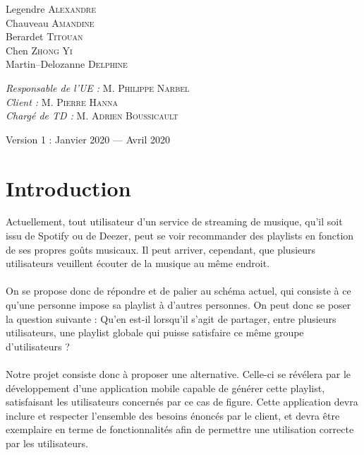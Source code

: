 \documentclass[12pt, openany]{report}
\begin{document}
\begin{titlepage}
\begin{sffamily}
\begin{center}
    \begin{minipage}{0.4\textwidth}
      \begin{flushleft} \large
        Legendre \textsc{Alexandre}\\
        Chauveau \textsc{Amandine}\\
        Berardet \textsc{Titouan}\\
        Chen \textsc{Zhong Yi}\\
        Martin--Delozanne \textsc{Delphine}\\
      \end{flushleft}
    \end{minipage}
    \begin{minipage}{0.4\textwidth}
      \begin{flushright} \large
        \emph{Responsable de l'UE : } M. \textsc{Philippe Narbel}\\
        \emph{Client : } M. \textsc{Pierre Hanna}\\
        \emph{Chargé de TD : } M. \textsc{Adrien Boussicault}
      \end{flushright}
    \end{minipage}

    \vfill

    {\large Version 1 : Janvier 2020 — Avril 2020}

  \end{center}
  \end{sffamily}
\end{titlepage}

\tableofcontents
\newpage

\section{Introduction}

Actuellement, tout utilisateur d'un service de streaming de musique, qu'il soit issu de Spotify ou de Deezer, peut se voir recommander des playlists en fonction de ses propres goûts musicaux.
Il peut arriver, cependant, que plusieurs utilisateurs veuillent écouter de la musique au même endroit. 
\\
\\
On se propose donc de répondre et de palier au schéma actuel, qui consiste à ce qu'une personne impose sa playlist à d'autres personnes.
On peut donc se poser la question suivante :
Qu'en est-il lorsqu'il s'agit de partager, entre plusieurs utilisateurs, une playlist globale qui puisse satisfaire ce même groupe d'utilisateurs ?
\\
\\
Notre projet consiste donc à proposer une alternative. 
Celle-ci se révélera par le développement d'une application mobile capable de générer cette playlist, satisfaisant les utilisateurs concernés par ce cas de figure.
Cette application devra inclure et respecter l'ensemble des besoins énoncés par le client, et devra être exemplaire en terme de fonctionnalités afin de permettre une utilisation correcte par les utilisateurs.
\end{document}
